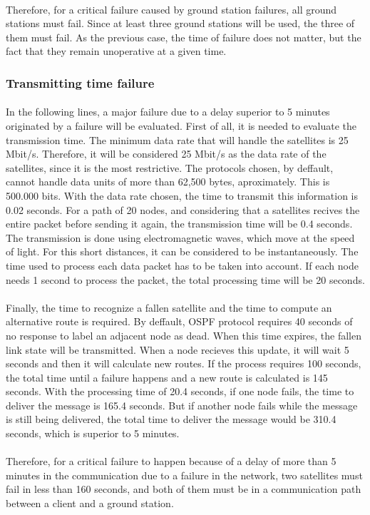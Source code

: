 \paragraph{}Therefore, for a critical failure caused by ground station failures, all ground stations must fail. Since at least three ground stations will be used, the three of them must fail. As the previous case, the time of failure does not matter, but the fact that they remain unoperative at a given time.

\subsubsection{Transmitting time failure}

\paragraph{}In the following lines, a major failure due to a delay superior to 5 minutes originated by a failure will be evaluated. First of all, it is needed to evaluate the transmission time. The minimum data rate that will handle the satellites is 25 Mbit/s. Therefore, it will be considered 25 Mbit/s as the data rate of the satellites, since it is the most restrictive. The protocols chosen, by deffault, cannot handle data units of more than 62,500 bytes, aproximately. This is 500.000 bits. With the data rate chosen, the time to transmit this information is 0.02 seconds. For a path of 20 nodes, and considering that a satellites recives the entire packet before sending it again, the transmission time will be 0.4 seconds. The transmission is done using electromagnetic waves, which move at the speed of light. For this short distances, it can be considered to be instantaneously. The time used to process each data packet has to be taken into account. If each node needs 1 second to process the packet, the total processing time will be 20 seconds. 

\paragraph{}Finally, the time to recognize a fallen satellite and the time to compute an alternative route is required. By deffault, OSPF protocol requires 40 seconds of no response to label an adjacent node as dead. When this time expires, the fallen link state will be transmitted. When a node recieves this update, it will wait 5 seconds and then it will calculate new routes. If the process requires 100 seconds, the total time until a failure happens and a new route is calculated is 145 seconds. With the processing time of 20.4 seconds, if one node fails, the time to deliver the message is 165.4 seconds. But if another node fails while the message is still being delivered, the total time to deliver the message would be 310.4 seconds, which is superior to 5 minutes.

\paragraph{}Therefore, for a critical failure to happen because of a delay of more than 5 minutes in the communication due to a failure in the network, two satellites must fail in less than 160 seconds, and both of them must be in a communication path between a client and a ground station.




 